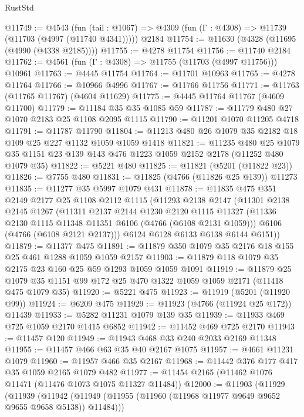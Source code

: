 \begin{lexlean}{RustStd}
\begin{coremodule}
@11749 := @4543
    (fun (tail : @1067) => @4309 (fun (Γ : @4308) => @11739 (@11703 (@4997 (@11740 @4341)))))
    @2184
@11754 := @11630 (@4328 (@11695 (@4990 (@4338 @2185))))
@11755 := @4278 @11754
@11756 := @11740 @2184
@11762 := @4561 (fun (Γ : @4308) => @11755 (@11703 (@4997 @11756))) @10961
@11763 := @4445 @11754
@11764 := @11701 @10963
@11765 := @4278 @11764
@11766 := @10966 @4996
@11767 := @11766 @11756
@11771 := @11763 (@11765 @11767) (@4604 @11629)
@11775 := @4445 @11764 @11767 (@4609 @11700)
@11779 := @11184 @35 @35 @1085 @59
@11787 := @11779 @480 @27 @1070 @2183 @25 @1108 @2095 @1115
@11790 := @11201 @1070 @11205 @4718
@11791 := @11787 @11790
@11804 := @11213 @480 @26 @1079 @35 @2182 @18 @109 @25 @227 @1132 @1059 @1059 @1418
@11821 := @11235
    @480
    @25
    @1079
    @35
    @1151
    @23
    @139
    @143
    @476
    @1223
    @1059
    @2152
    @2178
    (@11252 @480 @1079 @35)
@11822 := @5221 @480
@11825 := @11821 (@5201 (@11822 @23))
@11826 := @7755 @480
@11831 := @11825 (@4766 (@11826 @25 @139)) @11273
@11835 := @11277 @35 @5997 @1079 @431
@11878 := @11835
    @475
    @351
    @2149
    @2177
    @25
    @1108
    @2112
    @1115
    (@11293
      @2138
      @2147
      (@11301
        @2138
        @2145
        @1267
        (@11311
          @2137
          @2144
          @1230
          @2120
          @1115
          @11327
          (@11336 @2130 @1115 @11348 @11351 @6106 (@4766 (@6108 @2131 @1059)))
          @6106
          (@4766 (@6108 @2121 @2137)))
        @6124
        @6128
        @6133
        @6138
        @6144
        @6151))
@11879 := @11377 @475
@11891 := @11879 @350 @1079 @35 @2176 @18 @155 @25 @461 @1288 @1059 @1059 @2157
@11903 := @11879 @118 @1079 @35 @2175 @23 @160 @25 @59 @1293 @1059 @1059 @1091
@11919 := @11879
    @25
    @1079
    @35
    @1151
    @99
    @172
    @25
    @470
    @1322
    @1059
    @1059
    @2171
    (@11418 @475 @1079 @35)
@11920 := @5221 @475
@11923 := @11919 (@5201 (@11920 @99))
@11924 := @6209 @475
@11929 := @11923 (@4766 (@11924 @25 @172)) @11439
@11933 := @5282 @11231 @1079 @139 @35
@11939 := @11933 @469 @725 @1059 @2170 @1415 @6852
@11942 := @11452 @469 @725 @2170
@11943 := @11457 @120
@11949 := @11943 @468 @33 @240 @2033 @2169 @11348
@11955 := @11457 @466 @63 @35 @40 @2167 @1075
@11957 := @4661 @11231 @1079
@11960 := @11957 @466 @35 @2167
@11968 := @11442 @376 @177 @417 @35 @1059 @2165 @1079 @482
@11977 := @11454 @2165 (@11462 @1076 @11471 (@11476 @1073 @1075 @11327 @11484))
@12000 := @11903
    (@11929
      (@11939
        (@11942 (@11949 (@11955 (@11960 (@11968 @11977 @9649 @9652 @9655 @9658 @5138)) @11484)))

\end{coremodule}
\end{lexlean}
